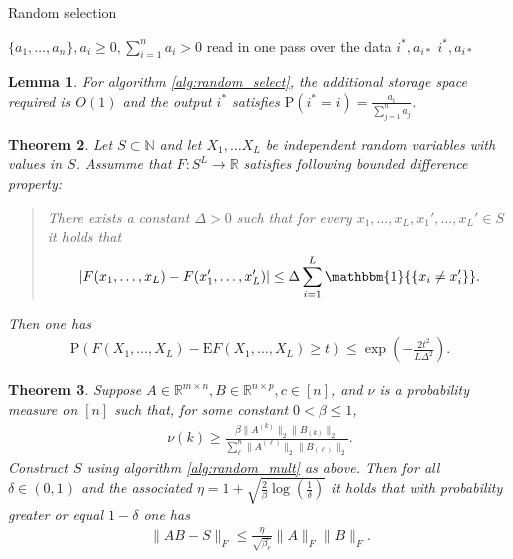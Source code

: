 \documentclass[13pt]{article}
\newtheorem{thm}{Theorem}[section]
\newtheorem{lem}[thm]{Lemma}
\theoremstyle{plain}
\newcommand{\R}{\mathbb{R}}
\newcommand{\N}{\mathbb{N}}
\newcommand{\E}{\bm{\mathrm{E}}}
\renewcommand{\P}{\bm{\mathrm{P}}}
\newcommand{\set}[1]{{\{#1\}}}
\newcommand{\ind}{\mathbbm{1}}
\begin{document}
\begin{algorithm}
\caption{Random selection}\label{alg:random_select}
\begin{algorithmic}
    \Require $\set{a_1, \ldots, a_n}, a_i \ge 0, \sum_{i=1}^{n} a_i > 0$ read in one pass over the data
    \Ensure $i^\ast, a_{i\ast}$
        \Comment{$\P = 1$ if $a_i = D = 0$}
    \EndFor
    \State \Return $i^\ast, a_{i\ast} $ 
\end{algorithmic}
\end{algorithm}

\begin{lem}
    For algorithm \ref{alg:random_select}, the additional storage space required
    is $O(1)$ and the output $i^\ast$ satisfies $\P(i^\ast = i) = \frac{a_i}{\sum_{j=1}^{n} a_j}$.
\end{lem}

\begin{thm}
    Let $S \subset \N$ and let $X_1, \ldots X_L$ be independent random variables
    with values in $S$. Assumme that $F: S^L \to \R$ satisfies following
    bounded difference property:
    \begin{quotation}
        There exists a constant $\Delta > 0$ such that for every
        $x_1,\ldots,x_L, x_1', \ldots, x_L' \in S$ it holds that
        \[
            \begin{aligned}
                |F(x_1, \ldots, x_L) - F(x_1', \ldots, x_L')| \le
                \Delta \sum_{i=1}^{L} \ind\set{x_i \ne x_i'}.
            \end{aligned}
        \]
    \end{quotation}
    Then one has
    \[
        \begin{aligned}
            \P\left( F\left( X_1,\ldots,X_L \right) - \E F(X_1,\ldots,X_L) \ge t \right)
            \le \exp\left( - \frac{2t^2}{L\Delta^2} \right) .
        \end{aligned}
    \]
\end{thm}

\begin{thm}
    Suppose $A \in \R^{m \times n}, B \in \R^{n \times p}, c \in [n]$,
    and $\nu$ is a probability measure on $[n]$ such that,
    for some constant $0 < \beta \le 1$,
    \[
        \begin{aligned}
            \nu(k) \ge \frac{\beta\|A^{(k)}\|_2\|B_{(k)}\|_2}{\sum_{\ell}^{n} \|A^{(\ell)}\|_2\|B_{(\ell)}\|_{2}}.
        \end{aligned}
    \]
    Construct $S$ using algorithm \ref{alg:random_mult} as above.
    Then for all $\delta \in (0, 1)$ and the associated $\eta = 1 + \sqrt{\frac{2}{\beta}\log(\frac{1}{\delta})} $
    it holds that with probability greater or equal $1 - \delta$ one has
    \[
        \begin{aligned}
            \|AB - S\|_F \le \frac{\eta}{\sqrt{\beta_c}}\|A\|_F\|B\|_F.
        \end{aligned}
    \]
\end{thm}
\end{document}
